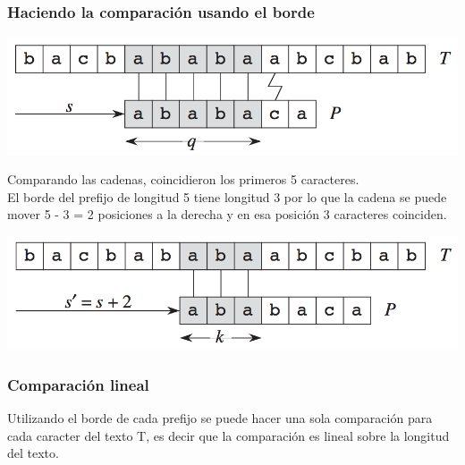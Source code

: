 \documentclass{beamer}
\begin{document}
	\begin{frame}
		\frametitle{Haciendo la comparación usando el borde}
		\begin{center} \includegraphics[height = 0.25\textheight]{Match1.png} \end{center}
		Comparando las cadenas, coincidieron los primeros 5 caracteres.\\
		El borde del prefijo de longitud 5 tiene longitud 3 por lo que la cadena se puede mover 5 - 3 = 2 posiciones a la derecha y en esa posición 3 caracteres coinciden.\\
		\begin{center} \includegraphics[height = 0.25\textheight]{Match2.png} \end{center}
	\end{frame}
	
	\begin{frame}
		\frametitle{Comparación lineal}
		Utilizando el borde de cada prefijo se puede hacer una sola comparación para cada caracter del texto T, es decir que la comparación es lineal sobre la longitud del texto.
	\end{frame}
	
\end{document}
